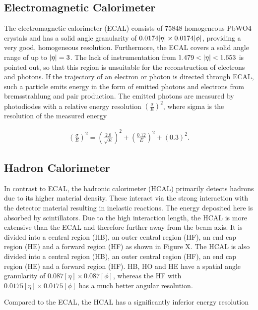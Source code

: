 \documentclass[12pt, a4paper]{thesis}
\begin{document}
\subsection{Electromagnetic Calorimeter}
\label{sec:orgf218141}

The electromagnetic calorimeter (ECAL) consists of 75848 homogeneous PbWO4
crystals and has a solid angle granularity of \(0.0174 \abs{\eta} \times 0.0174
\abs{\phi}\), providing a very good, homogeneous resolution. Furthermore, the
ECAL covers a solid angle range of up to \(\abs{\eta} = 3\). The lack of
instrumentation from \(1.479 < \abs{\eta} < 1.653\) is pointed out, so that this
region is unsuitable for the reconstruction of electrons and photons.  If the
trajectory of an electron or photon is directed through ECAL, such a particle
emits energy in the form of emitted photons and electrons from bremsstrahlung
and pair production. The emitted photons are measured by photodiodes with a
relative energy resolution \(\left( \frac{\sigma}{E} \right)^{2}\), where sigma is
the resolution of the measured energy

\begin{align}
\left( \frac{\sigma}{E} \right)^{2} = \left( \frac{2.8}{\sqrt{E}} \right)^{2} + \left( \frac{0.12}{E} \right)^{2}+(0.3)^{2}.
\end{align}


\subsection{Hadron Calorimeter}
\label{sec:orgde6b415}
In contrast to ECAL, the hadronic calorimeter (HCAL) primarily detects hadrons
due to its higher material density. These interact via the strong interaction
with the detector material resulting in inelastic reactions.  The energy
deposited here is absorbed by scintillators. Due to the high interaction length,
the HCAL is more extensive than the ECAL and therefore further away from the
beam axis. It is divided into a central region (HB), an outer central region
(HF), an end cap region (HE) and a forward region (HF) as shown in Figure X. The
HCAL is also divided into a central region (HB), an outer central region (HF),
an end cap region (HE) and a forward region (HF). HB, HO and HE have a spatial
angle granularity of \(0.087[\eta] \times 0.087 [\phi]\), whereas the HF with
\(0.0175 [\eta] \times 0.0175 [\phi]\) has a much better angular resolution.

Compared to the ECAL, the HCAL has a significantly inferior energy resolution
\end{document}
